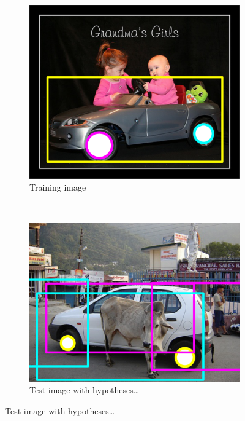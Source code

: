 \begin{figure}[hbt]
    \centering
    \begin{subfigure}[b]{0.3\textwidth}
        \centering
        \includegraphics[width=\textwidth]{aliasing}
        \caption{Training image}
        \label{fig:aliastrainim}
    \end{subfigure}
    ~
    \begin{subfigure}[b]{0.3\textwidth}
        \centering
        \includegraphics[width=\textwidth]{aliasing2}
        \caption{Test image with hypotheses\ldots}
        \label{fig:aliastestim}
    \end{subfigure}

\end{figure}
